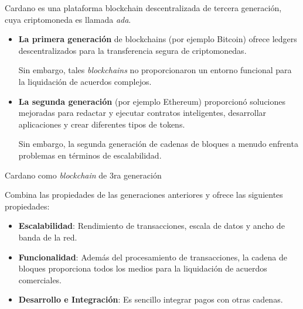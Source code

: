 \documentclass{beamer}
\newcommand{\nologo}{\setbeamertemplate{logo}{}} %
\begin{document}
{\nologo
\begin{frame}
Cardano es una plataforma blockchain descentralizada de tercera generación, cuya criptomoneda es llamada \textit{ada}. 

\vfill
\pause

\begin{itemize}
    \item \textbf{La primera generación} de blockchains (por ejemplo Bitcoin) ofrece ledgers descentralizados para la transferencia segura de criptomonedas. 
    \smallskip

    \pause Sin embargo, tales \textit{blockchains} no proporcionaron un entorno funcional para la liquidación de acuerdos complejos.
    \pause
    \vfill

    \item \textbf{La segunda generación} (por ejemplo Ethereum) proporcionó soluciones mejoradas para redactar y ejecutar contratos inteligentes, desarrollar aplicaciones y crear diferentes tipos de tokens.
    \smallskip

    \pause Sin embargo, la segunda generación de cadenas de bloques a menudo enfrenta problemas en términos de escalabilidad.
\end{itemize}
\end{frame}
}

\begin{frame}{Cardano como \textit{blockchain} de 3ra generación}

Combina las propiedades de las generaciones anteriores y ofrece las siguientes propiedades:
\vfill
\pause

\begin{itemize}
    \item \textbf{Escalabilidad}: Rendimiento de transacciones, escala de datos y ancho de banda de la red.
        \pause
    \item \textbf{Funcionalidad}: Además del procesamiento de transacciones, la cadena de bloques proporciona todos los medios para la liquidación de acuerdos comerciales. 
        \pause
    \item \textbf{Desarrollo e Integración}: Es sencillo integrar pagos con otras cadenas.
\end{itemize} 

\end{frame}


\end{document}
